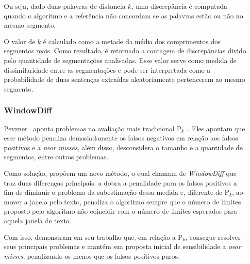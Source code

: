 Ou seja, dado duas palavras de distancia $k$, uma discrepância é computada quando o algoritmo e a referência não concordam se as palavras estão ou não no mesmo segmento.

O valor de $k$ é calculado como a metade da média dos comprimentos dos segmentos reais. Como resultado, é retornado a contagem de discrepâncias divido pelo quantidade de segmentações analisadas. Esse valor serve como medida de dissimilaridade entre as segmentações e pode ser interpretada como a probabilidade de duas sentenças extraídas aleatoriamente pertencerem ao mesmo segmento.



\subsubsection{WindowDiff}

Pevzner~\cite{Pevzner2002} aponta problemas na avaliação mais tradicional P$_k$~\cite{Beeferman1999}. Eles apontam que esse método penaliza demasiadamente os falsos negativos em relação aos falsos positivos e a \textit{near misses}, além disso, desconsidera o tamanho e a quantidade de segmentos, entre outros problemas.

Como solução, propõem um novo método, o qual chamam de \textit{WindowDiff} que traz duas diferenças principais: a dobra a penalidade para os falsos positivos a fim de diminuir o problema da subestimação dessa medida e, diferente de P$_k$, ao mover a janela pelo texto, penaliza o algoritmo sempre que o número de limites proposto pelo algoritmo não coincidir com o número de limites esperados para aquela janela de texto. 

Com isso, demonstram em seu trabalho que, em relação a P$_k$, consegue resolver seus principais problemas e mantém sua proposta inicial de sensibilidade a \textit{near misses}, penalizando-os menos que os falsos positivos puros.


  







